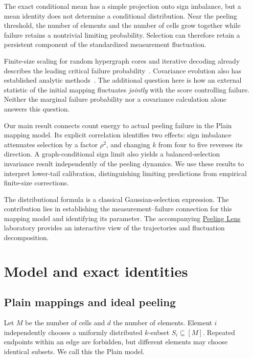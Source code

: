 \documentclass[11pt,a4paper]{article}
\begin{document}
The exact conditional mean has a simple projection onto sign imbalance, but a mean identity does not determine a conditional distribution. Near the peeling threshold, the number of elements and the number of cells grow together while failure retains a nontrivial limiting probability. Selection can therefore retain a persistent component of the standardized measurement fluctuation.

Finite-size scaling for random hypergraph cores and iterative decoding already describes the leading critical failure probability~\cite{dm,amru}. Covariance evolution also has established analytic methods~\cite{nks}. The additional question here is how an external statistic of the initial mapping fluctuates \emph{jointly} with the score controlling failure. Neither the marginal failure probability nor a covariance calculation alone answers this question.

Our main result connects count energy to actual peeling failure in the Plain mapping model. Its explicit correlation identifies two effects: sign imbalance attenuates selection by a factor $\rho^2$, and changing $k$ from four to five reverses its direction. A graph-conditional sign limit also yields a balanced-selection invariance result independently of the peeling dynamics. We use these results to interpret lower-tail calibration, distinguishing limiting predictions from empirical finite-size corrections.

The distributional formula is a classical Gaussian-selection expression. The contribution lies in establishing the measurement--failure connection for this mapping model and identifying its parameter. The accompanying \href{https://github.com/whitewum/peeling-lens}{Peeling Lens} laboratory provides an interactive view of the trajectories and fluctuation decomposition.

\section{Model and exact identities}
\subsection{Plain mappings and ideal peeling}
Let $M$ be the number of cells and $d$ the number of elements. Element $i$ independently chooses a uniformly distributed $k$-subset $S_i\subseteq[M]$. Repeated endpoints within an edge are forbidden, but different elements may choose identical subsets. We call this the Plain model.
\end{document}
